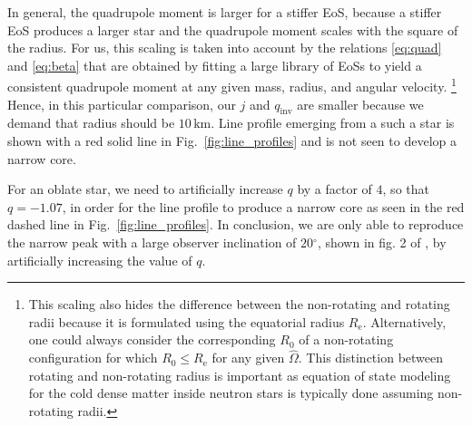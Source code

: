 \documentclass{aa}
\newcommand{\refe}[1]{#1}
\newcommand{\refedel}[1]{}
\newcommand{\Ob}{\ensuremath{\hat{\Omega}}}
\newcommand{\Msun}{\ensuremath{M_{\odot}}}
\newcommand{\qinv}{\ensuremath{q_{\mathrm{inv}}}}
\renewcommand{\deg}{\ensuremath{^{\circ}}}
\begin{document}
In general, the quadrupole moment is larger for a stiffer EoS, because a stiffer EoS produces a larger star and the quadrupole moment scales with the square of the radius.
For us, this scaling is taken into account by the relations \eqref{eq:quad} and \eqref{eq:beta} that are obtained by fitting a large library of EoSs \citep[see][]{BBP13, aGM14} to yield a consistent quadrupole moment at any given mass, radius,\refedel{ (i.e., stiffness)} and angular velocity.%
\footnote{This scaling also hides the difference between the non-rotating and rotating radii because it is formulated using the equatorial radius $R_{\mathrm{e}}$.
Alternatively, one could always consider the corresponding $R_0$ of a non-rotating configuration for which $R_0 \le R_{\mathrm{e}}$ for any given $\Ob$.
\refe{This distinction between rotating and non-rotating radius is important as equation of state modeling for the cold dense matter inside neutron stars is typically done assuming non-rotating radii.}
}
Hence, in this particular comparison, our $j$ and $\qinv$ are smaller because we demand that radius should be $10\,\mathrm{km}$.
Line profile emerging from a such a star is shown with a red solid line in Fig.~\ref{fig:line_profiles} and is not seen to develop a narrow core. 
\refedel{This is because the quadrupole moment is not strong enough to dominate the countering effect of the region of increased redshift around the pole.}
For an oblate star, we need to artificially increase $q$ by a factor of $4$, so that $q = -1.07$, in order for the line profile to produce a narrow core as seen in the red dashed line in Fig.~\ref{fig:line_profiles}.
In conclusion, we are only able to reproduce the narrow peak with a large observer inclination of $20\deg$, shown in fig. 2 of \citet{BPO13}, by \refe{artificially increasing the value of $q$}. 
\end{document}
